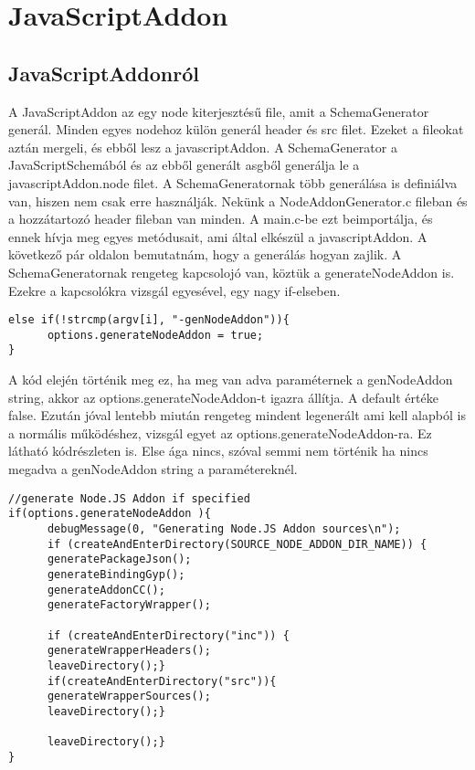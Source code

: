 \chapter{JavaScriptAddon}\label{chap:JavaScriptAddon}

\section{JavaScriptAddonról}

\noindent

A JavaScriptAddon az egy node kiterjesztésű file, amit a SchemaGenerator generál. Minden egyes nodehoz külön generál header és src filet.
Ezeket a fileokat aztán mergeli, és ebből lesz a javascriptAddon.
A SchemaGenerator a JavaScriptSchemából és az ebből generált asgből generálja le a javascriptAddon.node filet.
A SchemaGeneratornak több generálása is definiálva van, hiszen nem csak erre használják. Nekünk a NodeAddonGenerator.c fileban és a hozzátartozó header fileban van minden.
A main.c-be ezt beimportálja, és ennek hívja meg egyes metódusait, ami által elkészül a javascriptAddon.
A következő pár oldalon bemutatnám, hogy a generálás hogyan zajlik.
A SchemaGeneratornak rengeteg kapcsolojó van, köztük a generateNodeAddon is. Ezekre a kapcsolókra vizsgál egyesével, egy nagy if-elseben.
\begin{lstlisting}[caption={SchemaGenerator kapcsoló vizsgálás},label={lst:schemagenerator_argv_genNodeAddon}, language={CStyle}]
else if(!strcmp(argv[i], "-genNodeAddon")){
      options.generateNodeAddon = true;
}
\end{lstlisting}
A kód elején történik meg ez, ha meg van adva paraméternek a genNodeAddon string, akkor az options.generateNodeAddon-t igazra állítja. A default értéke false.
Ezután jóval lentebb miután rengeteg mindent legenerált ami kell alapból is a normális működéshez, vizsgál egyet az options.generateNodeAddon-ra.
Ez látható  kódrészleten is. Else ága nincs, szóval semmi nem történik ha nincs megadva a genNodeAddon string a paramétereknél.
\begin{lstlisting}[caption={SchemaGenerator javascriptAddon generálás},label={lst:schemagenerator_genNodeAddon_check}, language={CStyle}]
//generate Node.JS Addon if specified
if(options.generateNodeAddon ){
      debugMessage(0, "Generating Node.JS Addon sources\n");
      if (createAndEnterDirectory(SOURCE_NODE_ADDON_DIR_NAME)) {
      generatePackageJson();
      generateBindingGyp();
      generateAddonCC();
      generateFactoryWrapper();

      if (createAndEnterDirectory("inc")) {
      generateWrapperHeaders();
      leaveDirectory();}
      if(createAndEnterDirectory("src")){
      generateWrapperSources();
      leaveDirectory();}

      leaveDirectory();}
}
\end{lstlisting}


